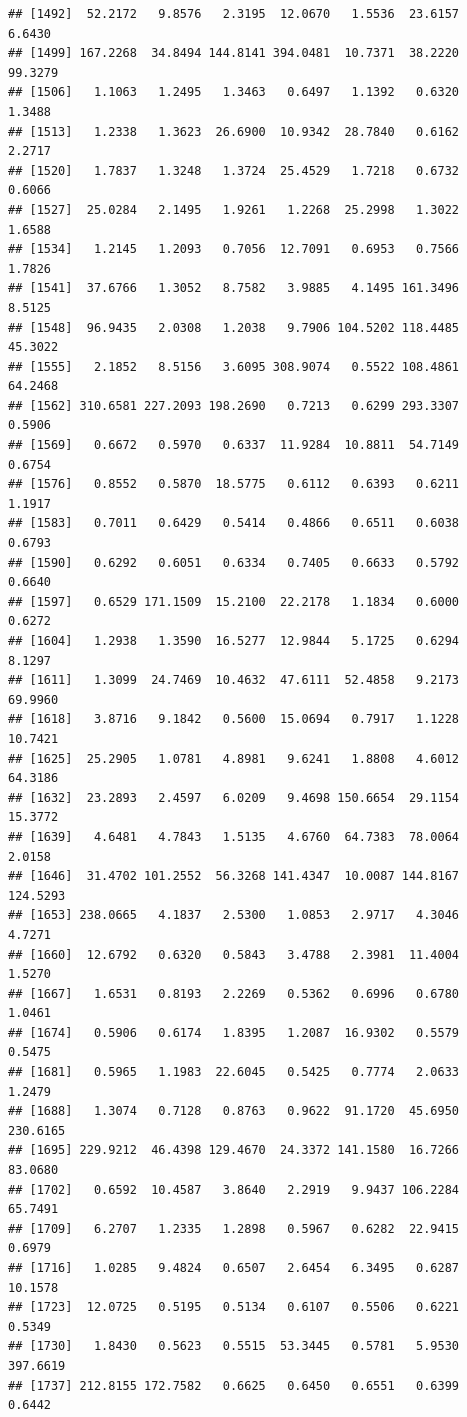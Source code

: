 \documentclass{article}\usepackage[]{graphicx}\usepackage[]{color}
\makeatletter
\newenvironment{kframe}{%
 \def\at@end@of@kframe{}%
 \ifinner\ifhmode%
  \def\at@end@of@kframe{\end{minipage}}%
  \begin{minipage}{\columnwidth}%
 \fi\fi%
 \def\FrameCommand##1{\hskip\@totalleftmargin \hskip-\fboxsep
 \colorbox{shadecolor}{##1}\hskip-\fboxsep
     \hskip-\linewidth \hskip-\@totalleftmargin \hskip\columnwidth}%
 \MakeFramed {\advance\hsize-\width
   \@totalleftmargin\z@ \linewidth\hsize
   \@setminipage}}%
 {\par\unskip\endMakeFramed%
 \at@end@of@kframe}
\newenvironment{knitrout}{}{} %
\makeatother
\begin{document}
\begin{knitrout}
\begin{kframe}
\begin{verbatim}
## [1492]  52.2172   9.8576   2.3195  12.0670   1.5536  23.6157   6.6430
## [1499] 167.2268  34.8494 144.8141 394.0481  10.7371  38.2220  99.3279
## [1506]   1.1063   1.2495   1.3463   0.6497   1.1392   0.6320   1.3488
## [1513]   1.2338   1.3623  26.6900  10.9342  28.7840   0.6162   2.2717
## [1520]   1.7837   1.3248   1.3724  25.4529   1.7218   0.6732   0.6066
## [1527]  25.0284   2.1495   1.9261   1.2268  25.2998   1.3022   1.6588
## [1534]   1.2145   1.2093   0.7056  12.7091   0.6953   0.7566   1.7826
## [1541]  37.6766   1.3052   8.7582   3.9885   4.1495 161.3496   8.5125
## [1548]  96.9435   2.0308   1.2038   9.7906 104.5202 118.4485  45.3022
## [1555]   2.1852   8.5156   3.6095 308.9074   0.5522 108.4861  64.2468
## [1562] 310.6581 227.2093 198.2690   0.7213   0.6299 293.3307   0.5906
## [1569]   0.6672   0.5970   0.6337  11.9284  10.8811  54.7149   0.6754
## [1576]   0.8552   0.5870  18.5775   0.6112   0.6393   0.6211   1.1917
## [1583]   0.7011   0.6429   0.5414   0.4866   0.6511   0.6038   0.6793
## [1590]   0.6292   0.6051   0.6334   0.7405   0.6633   0.5792   0.6640
## [1597]   0.6529 171.1509  15.2100  22.2178   1.1834   0.6000   0.6272
## [1604]   1.2938   1.3590  16.5277  12.9844   5.1725   0.6294   8.1297
## [1611]   1.3099  24.7469  10.4632  47.6111  52.4858   9.2173  69.9960
## [1618]   3.8716   9.1842   0.5600  15.0694   0.7917   1.1228  10.7421
## [1625]  25.2905   1.0781   4.8981   9.6241   1.8808   4.6012  64.3186
## [1632]  23.2893   2.4597   6.0209   9.4698 150.6654  29.1154  15.3772
## [1639]   4.6481   4.7843   1.5135   4.6760  64.7383  78.0064   2.0158
## [1646]  31.4702 101.2552  56.3268 141.4347  10.0087 144.8167 124.5293
## [1653] 238.0665   4.1837   2.5300   1.0853   2.9717   4.3046   4.7271
## [1660]  12.6792   0.6320   0.5843   3.4788   2.3981  11.4004   1.5270
## [1667]   1.6531   0.8193   2.2269   0.5362   0.6996   0.6780   1.0461
## [1674]   0.5906   0.6174   1.8395   1.2087  16.9302   0.5579   0.5475
## [1681]   0.5965   1.1983  22.6045   0.5425   0.7774   2.0633   1.2479
## [1688]   1.3074   0.7128   0.8763   0.9622  91.1720  45.6950 230.6165
## [1695] 229.9212  46.4398 129.4670  24.3372 141.1580  16.7266  83.0680
## [1702]   0.6592  10.4587   3.8640   2.2919   9.9437 106.2284  65.7491
## [1709]   6.2707   1.2335   1.2898   0.5967   0.6282  22.9415   0.6979
## [1716]   1.0285   9.4824   0.6507   2.6454   6.3495   0.6287  10.1578
## [1723]  12.0725   0.5195   0.5134   0.6107   0.5506   0.6221   0.5349
## [1730]   1.8430   0.5623   0.5515  53.3445   0.5781   5.9530 397.6619
## [1737] 212.8155 172.7582   0.6625   0.6450   0.6551   0.6399   0.6442

\end{verbatim}
\end{kframe}
\end{knitrout}
\end{document}
